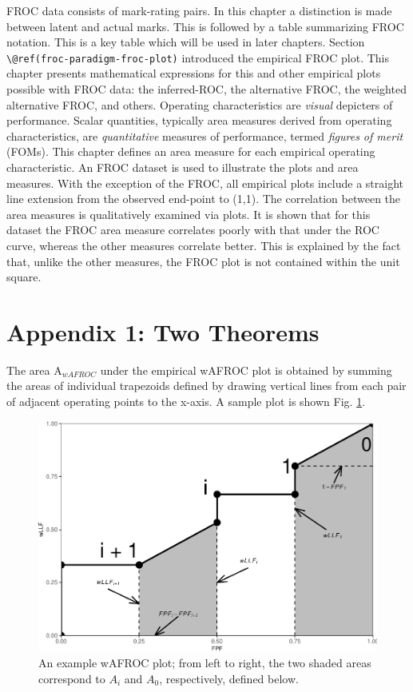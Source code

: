 \documentclass[
]{book}
\begin{document}
FROC data consists of mark-rating pairs. In this chapter a distinction is made between latent and actual marks. This is followed by a table summarizing FROC notation. This is a key table which will be used in later chapters. Section \texttt{\textbackslash{}@ref(froc-paradigm-froc-plot)} introduced the empirical FROC plot. This chapter presents mathematical expressions for this and other empirical plots possible with FROC data: the inferred-ROC, the alternative FROC, the weighted alternative FROC, and others. Operating characteristics are \emph{visual} depicters of performance. Scalar quantities, typically area measures derived from operating characteristics, are \emph{quantitative} measures of performance, termed \emph{figures of merit} (FOMs). This chapter defines an area measure for each empirical operating characteristic. An FROC dataset is used to illustrate the plots and area measures. With the exception of the FROC, all empirical plots include a straight line extension from the observed end-point to (1,1). The correlation between the area measures is qualitatively examined via plots. It is shown that for this dataset the FROC area measure correlates poorly with that under the ROC curve, whereas the other measures correlate better. This is explained by the fact that, unlike the other measures, the FROC plot is not contained within the unit square.

\hypertarget{empirical-two-theorems}{%
\section{Appendix 1: Two Theorems}\label{empirical-two-theorems}}

The area \(\text{A}_{wAFROC}\) under the empirical wAFROC plot is obtained by summing the areas of individual trapezoids defined by drawing vertical lines from each pair of adjacent operating points to the x-axis. A sample plot is shown Fig. \ref{fig:empirical-theorems}.

\begin{figure}
\centering
\includegraphics{03-empirical_files/figure-latex/empirical-theorems-1.pdf}
\caption{\label{fig:empirical-theorems}An example wAFROC plot; from left to right, the two shaded areas correspond to \(A_i\) and \(A_0\), respectively, defined below.}
\end{figure}
\end{document}
